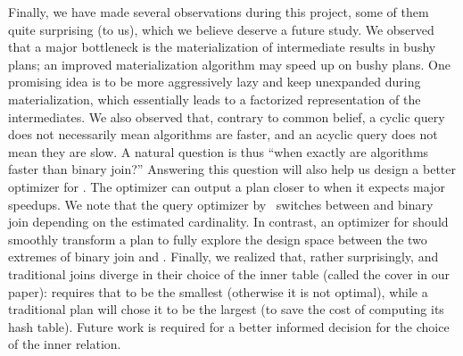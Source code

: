   Finally, we have made several observations during this project, some
  of them quite surprising (to us), which we believe deserve a future
  study.  We observed that a major bottleneck is the materialization of
  intermediate results in bushy plans; an improved materialization
  algorithm may speed up \FJ on bushy plans.  One promising idea is to
  be more aggressively lazy and keep \COLTs unexpanded during
  materialization, which essentially leads to a factorized
  representation of the intermediates.  We also observed that, contrary
  to common belief, a cyclic query does not necessarily mean \WCOJ
  algorithms are faster, and an acyclic query does not mean they are
  slow.  A natural question is thus ``when exactly are \WCOJ algorithms
  faster than binary join?''  Answering this question will also help us
  design a better optimizer for \FJ.  The optimizer can output a plan
  closer to \WCOJ when it expects major speedups.  We note that the
  query optimizer by~\cite{DBLP:journals/pvldb/FreitagBSKN20} switches
  between \GJ and binary join depending on the estimated cardinality.
  In contrast, an optimizer for \FJ should smoothly transform a \FJ plan
  to fully explore the design space between the two extremes of binary
  join and \GJ.  Finally, we realized that, rather surprisingly, \GJ and
  traditional joins diverge in their choice of the inner table (called
  the cover in our paper): \GJ requires that to be the smallest
  (otherwise it is not optimal), while a traditional plan will chose it
  to be the largest (to save the cost of computing its hash table).
  Future work is required for a better informed decision for the choice
  of the inner relation.
  

